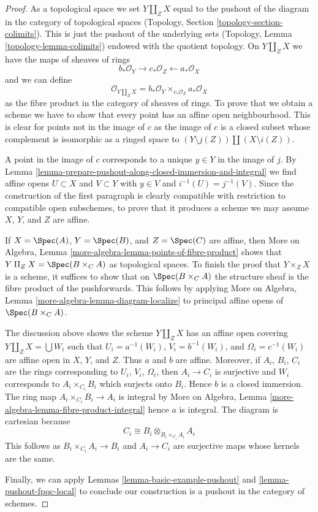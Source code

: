 \begin{proof}
As a topological space we set $Y \amalg_Z X$ equal to the pushout of
the diagram in the category of topological spaces (Topology, Section
\ref{topology-section-colimits}). This is just the pushout
of the underlying sets (Topology, Lemma \ref{topology-lemma-colimits})
endowed with the quotient topology.
On $Y \amalg_Z X$ we have the maps of sheaves of rings
$$
b_*\mathcal{O}_Y \longrightarrow c_*\mathcal{O}_Z
\longleftarrow a_*\mathcal{O}_X
$$
and we can define
$$
\mathcal{O}_{Y \amalg_Z X} =
b_*\mathcal{O}_Y \times_{c_*\mathcal{O}_Z} a_*\mathcal{O}_X
$$
as the fibre product in the category of sheaves of rings. To prove that we
obtain a scheme we have to show that every point has an
affine open neighbourhood. This is clear for points not in the image of $c$
as the image of $c$ is a closed subset whose complement is
isomorphic as a ringed space to $(Y \setminus j(Z)) \amalg (X \setminus i(Z))$.

\medskip\noindent
A point in the image of $c$ corresponds to a unique $y \in Y$
in the image of $j$. By
Lemma \ref{lemma-prepare-pushout-along-closed-immersion-and-integral}
we find affine opens $U \subset X$ and $V \subset Y$ with
$y \in V$ and $i^{-1}(U) = j^{-1}(V)$.
Since the construction of the first paragraph is clearly compatible
with restriction to compatible open subschemes, to prove that it
produces a scheme we may assume $X$, $Y$, and $Z$ are affine.

\medskip\noindent
If $X = \Spec(A)$, $Y = \Spec(B)$, and $Z = \Spec(C)$ are affine, then
More on Algebra, Lemma \ref{more-algebra-lemma-points-of-fibre-product}
shows that $Y \amalg_Z X = \Spec(B \times_C A)$ as topological spaces.
To finish the proof that $Y \times_Z X$ is a scheme, it suffices to show
that on $\Spec(B \times_C A)$ the structure sheaf is the fibre product
of the pushforwards. This follows by applying
More on Algebra, Lemma \ref{more-algebra-lemma-diagram-localize}
to principal affine opens of $\Spec(B \times_C A)$.

\medskip\noindent
The discussion above shows the scheme $Y \amalg_Z X$
has an affine open covering $Y \amalg_Z X = \bigcup W_i$
such that $U_i = a^{-1}(W_i)$, $V_i = b^{-1}(W_i)$, and
$\Omega_i = c^{-1}(W_i)$ are affine open in $X$, $Y$, and $Z$.
Thus $a$ and $b$ are affine.
Moreover, if $A_i$, $B_i$, $C_i$ are the rings corresponding to
$U_i$, $V_i$, $\Omega_i$, then $A_i \to C_i$ is surjective and
$W_i$ corresponds to $A_i \times_{C_i} B_i$ which surjects onto
$B_i$. Hence $b$ is a closed immersion.
The ring map $A_i \times_{C_i} B_i \to A_i$ is integral by
More on Algebra, Lemma \ref{more-algebra-lemma-fibre-product-integral}
hence $a$ is integral. The diagram is cartesian because
$$
C_i \cong B_i \otimes_{B_i \times_{C_i} A_i} A_i
$$
This follows as $B_i \times_{C_i} A_i \to B_i$
and $A_i \to C_i$ are surjective maps whose kernels are the same.

\medskip\noindent
Finally, we can apply Lemmas \ref{lemma-basic-example-pushout} and
\ref{lemma-pushout-fpqc-local} to conclude our construction is a pushout
in the category of schemes.
\end{proof}


